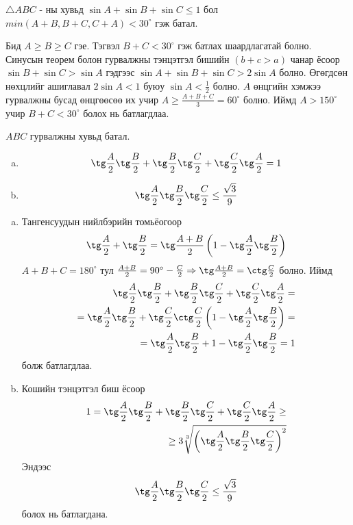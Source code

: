 \documentclass[10pt,a4paper,oneside]{book}
\begin{document}
\Problem
$\triangle ABC$ - ны хувьд $\sin A + \sin B + \sin C \leq 1$ бол $min\left(A+B, B+C, C+A\right) < 30^\circ$ гэж батал.

\TheSolution
Бид $A \geq B \geq C$ гэе. Тэгвэл $B+C < 30^\circ$ гэж батлах шаардлагатай болно. Синусын теорем болон гурвалжны тэнцэтгэл бишийн $(b+c > a)$ чанар ёсоор $\sin B + \sin C > \sin A$ гэдгээс $\sin A + \sin B + \sin C > 2\sin A$ болно. Өгөгдсөн нөхцлийг ашиглавал $2\sin A < 1$ буюу $\sin A < \frac{1}{2}$ болно. $A$ өнцгийн хэмжээ гурвалжны бусад өнцгөөсөө их учир $A \geq \frac{A+B+C}{3} = 60^\circ$ болно. Иймд $A > 150^\circ$ учир $B+C < 30^\circ$ болох нь батлагдлаа.

\Problem
$ABC$ гурвалжны хувьд батал.
\begin{enumerate}[(a)]
\item
\begin{equation*}
\tg \frac{A}{2}\tg \frac{B}{2} + \tg \frac{B}{2} \tg \frac{C}{2} + \tg \frac{C}{2} \tg \frac{A}{2} = 1
\end{equation*}
\item
\begin{equation*}
\tg \frac{A}{2} \tg \frac{B}{2} \tg \frac{C}{2} \leq \frac{\sqrt{3}}{9}
\end{equation*}
\end{enumerate}

\TheSolution
\begin{enumerate}[(a)]
\item
Тангенсуудын нийлбэрийн томьёогоор
\begin{equation*}
\tg \frac{A}{2} + \tg \frac{B}{2} = \tg \frac{A+B}{2} \left(1-\tg \frac{A}{2}\tg \frac{B}{2}\right)
\end{equation*}
$A+B+C = 180^\circ$ тул $\frac{A+B}{2}=90^\circ - \frac{C}{2} \Rightarrow \tg\frac{A+B}{2} = \ctg\frac{C}{2}$ болно.
Иймд
\begin{align*}
\tg\frac{A}{2}\tg\frac{B}{2} + \tg\frac{B}{2}\tg\frac{C}{2}+\tg\frac{C}{2}\tg\frac{A}{2} =\\
=\tg\frac{A}{2}\tg\frac{B}{2} + \tg\frac{C}{2}\ctg\frac{C}{2}\left(1-\tg\frac{A}{2}\tg\frac{B}{2}\right) =\\
= \tg\frac{A}{2}\tg\frac{B}{2} + 1 - \tg\frac{A}{2}\tg\frac{B}{2} = 1
\end{align*}
болж батлагдлаа.


\item
Кошийн тэнцэтгэл биш ёсоор
\begin{align*}
1 = \tg \frac{A}{2}\tg\frac{B}{2} + \tg\frac{B}{2}\tg\frac{C}{2}+\tg\frac{C}{2}\tg\frac{A}{2} \geq\\
\geq 3\sqrt[3]{\left(\tg \frac{A}{2}\tg\frac{B}{2}\tg\frac{C}{2}\right)^2}
\end{align*}
Эндээс
\begin{equation*}
\tg\frac{A}{2}\tg\frac{B}{2}\tg\frac{C}{2} \leq \frac{\sqrt{3}}{9}
\end{equation*}
болох нь батлагдана.
\end{enumerate}
\end{document}
